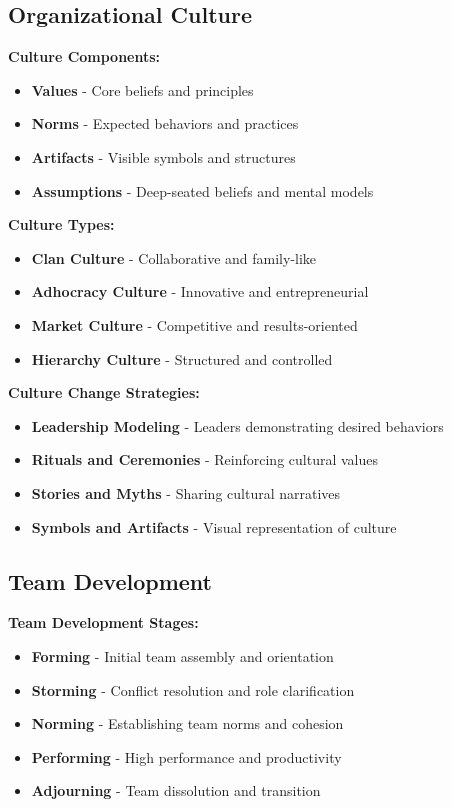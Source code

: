 \documentclass[12pt]{article}
\begin{document}
\subsection{Organizational Culture}

\textbf{Culture Components:}
\begin{itemize}
    \item \textbf{Values} - Core beliefs and principles
    \item \textbf{Norms} - Expected behaviors and practices
    \item \textbf{Artifacts} - Visible symbols and structures
    \item \textbf{Assumptions} - Deep-seated beliefs and mental models
\end{itemize}

\textbf{Culture Types:}
\begin{itemize}
    \item \textbf{Clan Culture} - Collaborative and family-like
    \item \textbf{Adhocracy Culture} - Innovative and entrepreneurial
    \item \textbf{Market Culture} - Competitive and results-oriented
    \item \textbf{Hierarchy Culture} - Structured and controlled
\end{itemize}

\textbf{Culture Change Strategies:}
\begin{itemize}
    \item \textbf{Leadership Modeling} - Leaders demonstrating desired behaviors
    \item \textbf{Rituals and Ceremonies} - Reinforcing cultural values
    \item \textbf{Stories and Myths} - Sharing cultural narratives
    \item \textbf{Symbols and Artifacts} - Visual representation of culture
\end{itemize}

\subsection{Team Development}

\textbf{Team Development Stages:}
\begin{itemize}
    \item \textbf{Forming} - Initial team assembly and orientation
    \item \textbf{Storming} - Conflict resolution and role clarification
    \item \textbf{Norming} - Establishing team norms and cohesion
    \item \textbf{Performing} - High performance and productivity
    \item \textbf{Adjourning} - Team dissolution and transition
\end{itemize}
\end{document}
